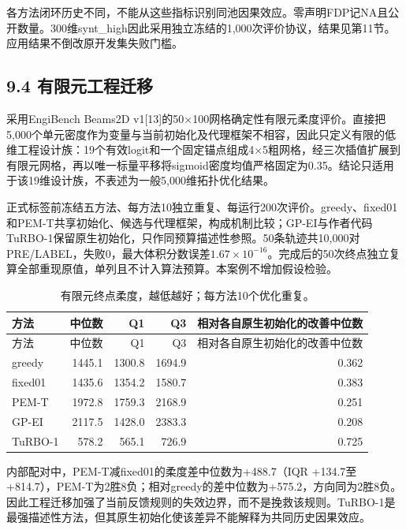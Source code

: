 \documentclass[11pt,a4paper]{article}
\begin{document}
各方法闭环历史不同，不能从这些指标识别同池因果效应。零声明FDP记NA且公开数量。300维synt\_high因此采用独立冻结的1,000次评价协议，结果见第11节。应用结果不倒改原开发集失败门槛。

\hypertarget{ux6709ux9650ux5143ux5de5ux7a0bux8fc1ux79fb}{%
\subsection{9.4
有限元工程迁移}\label{ux6709ux9650ux5143ux5de5ux7a0bux8fc1ux79fb}}

采用EngiBench Beams2D
v1{[}13{]}的50×100网格确定性有限元柔度评价。直接把5,000个单元密度作为变量与当前初始化及代理框架不相容，因此只定义有限的低维工程设计族：19个有效logit和一个固定锚点组成4×5粗网格，经三次插值扩展到有限元网格，再以唯一标量平移将sigmoid密度均值严格固定为0.35。结论只适用于该19维设计族，不表述为一般5,000维拓扑优化结果。

正式标签前冻结五方法、每方法10独立重复、每运行200次评价。greedy、fixed01和PEM-T共享初始化、候选与代理框架，构成机制比较；GP-EI与作者代码TuRBO-1保留原生初始化，只作同预算描述性参照。50条轨迹共10,000对PRE/LABEL，失败0，最大体积分数误差\(1.67\times10^{-16}\)。完成后的50次终点独立复算全部重现原值，单列且不计入算法预算。本案例不增加假设检验。

\par\noindent\begin{minipage}{\linewidth}

\begin{longtable}[]{@{}lrrrr@{}}
\caption{有限元终点柔度，越低越好；每方法10个优化重复。}\tabularnewline
\toprule
方法 & 中位数 & Q1 & Q3 & 相对各自原生初始化的改善中位数 \\
\midrule
\endfirsthead
\toprule
方法 & 中位数 & Q1 & Q3 & 相对各自原生初始化的改善中位数 \\
\midrule
\endhead
greedy & 1445.1 & 1300.8 & 1694.9 & 0.362 \\
fixed01 & 1435.6 & 1354.2 & 1580.7 & 0.383 \\
PEM-T & 1972.8 & 1759.3 & 2168.9 & 0.251 \\
GP-EI & 2117.5 & 1428.0 & 2383.3 & 0.208 \\
TuRBO-1 & 578.2 & 565.1 & 726.9 & 0.725 \\
\bottomrule
\end{longtable}

\end{minipage}\par

内部配对中，PEM-T减fixed01的柔度差中位数为+488.7（IQR
+134.7至+814.7），PEM-T为2胜8负；相对greedy的差中位数为+575.2，方向同为2胜8负。因此工程迁移加强了当前反馈规则的失效边界，而不是挽救该规则。TuRBO-1是最强描述性方法，但其原生初始化使该差异不能解释为共同历史因果效应。
\end{document}
